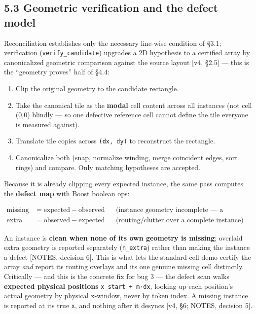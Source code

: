 \documentclass[
  11pt,
]{article}
\newcounter{none} %
\providecommand{\tightlist}{%
  \setlength{\itemsep}{0pt}\setlength{\parskip}{0pt}}
\begin{document}
\subsection{5.3 Geometric verification and the defect
model}\label{geometric-verification-and-the-defect-model}

Reconciliation establishes only the necessary line-wise condition of
§3.1; verification (\texttt{verify\_candidate}) upgrades a 2D hypothesis
to a certified array by canonicalized geometric comparison against the
source layout {[}v4, §2.5{]} --- this is the ``geometry proves'' half of
§4.4:

\begin{enumerate}
\def\labelenumi{\arabic{enumi}.}
\tightlist
\item
  Clip the original geometry to the candidate rectangle.
\item
  Take the canonical tile as the \textbf{modal} cell content across all
  instances (not cell (0,0) blindly --- so one defective reference cell
  cannot define the tile everyone is measured against).
\item
  Translate tile copies across \texttt{(dx,\ dy)} to reconstruct the
  rectangle.
\item
  Canonicalize both (snap, normalize winding, merge coincident edges,
  sort rings) and compare. Only matching hypotheses are accepted.
\end{enumerate}

Because it is already clipping every expected instance, the same pass
computes the \textbf{defect map} with Boost boolean ops:

\[\begin{aligned}
\text{missing} &= \text{expected} - \text{observed} && \text{(instance geometry incomplete — a structural defect)}\\
\text{extra} &= \text{observed} - \text{expected} && \text{(routing/clutter over a complete instance)}
\end{aligned}\]

An instance is \textbf{clean when none of its own geometry is missing};
overlaid extra geometry is reported separately (\texttt{n\_extra})
rather than making the instance a defect {[}NOTES, decision 6{]}. This
is what lets the standard-cell demo certify the array \emph{and} report
its routing overlays and its one genuine missing cell distinctly.
Critically --- and this is the concrete fix for bug 3 --- the defect
scan walks \textbf{expected physical positions}
\texttt{x\_start\ +\ m·dx}, looking up each position's actual geometry
by physical x-window, never by token index. A missing instance is
reported at its true \texttt{x}, and nothing after it desyncs {[}v4, §6;
NOTES, decision 5{]}.
\end{document}
